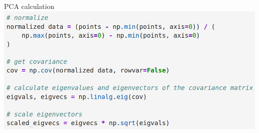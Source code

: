 \documentclass{irdbeamer}
\begin{document}
\begin{frame}{PCA calculation}
\centering
    \includegraphics[width=.8\textwidth]{./figs/pca_numpy.png}
\end{frame}





\end{document}

